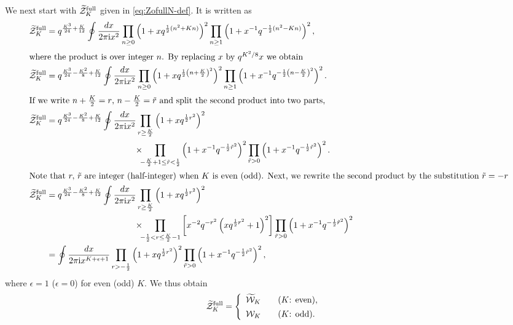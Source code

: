 \documentclass[11pt]{article}
\newcommand{\ri}{{\rm i}}
\newcommand{\hf}{\frac{1}{2}}
\def\til#1{\widetilde{#1}}
\newcommand{\nn}{\nonumber}
\renewcommand{\[}{\begin{eqnarray}}
\renewcommand{\]}{\end{eqnarray}}
\newcommand{\Zofull}{{\widetilde{\cal Z}}^{\text{full}}}
\begin{document}
We next start with $\Zofull_K$ given in \eqref{eq:ZofullN-def}.
It is written as
%
\begin{align}
\Zofull_K
&=q^{\frac{K^3}{24}+\frac{K}{12}}\oint\frac{dx}{2\pi\ri x^2}
 \prod_{n\ge 0}\left(1+xq^{\hf(n^2+Kn)}\right)^2
 \prod_{n\ge 1}\left(1+x^{-1}q^{-\hf(n^2-Kn)}\right)^2,\nn\\
\intertext{where the product is over integer $n$.
By replacing $x$ by $q^{K^2/8}x$ we obtain}
\Zofull_K
&=q^{\frac{K^3}{24}-\frac{K^2}{8}+\frac{K}{12}}\oint\frac{dx}{2\pi\ri x^2}
 \prod_{n\ge 0}\left(1+xq^{\hf\left(n+\frac{K}{2}\right)^2}\right)^2
 \prod_{n\ge 1}
  \left(1+x^{-1}q^{-\hf\left(n-\frac{K}{2}\right)^2}\right)^2.\nn\\
\intertext{If we write
$n+\frac{K}{2}=r$, $n-\frac{K}{2}=\tilde{r}$ and split the second
 product into two parts,}
\Zofull_K
&=q^{\frac{K^3}{24}-\frac{K^2}{8}+\frac{K}{12}}\oint\frac{dx}{2\pi\ri x^2}
 \prod_{r\ge\frac{K}{2}}\left(1+xq^{\hf r^2}\right)^2\nn\\
&\phantom{=q^{\frac{K^3}{24}-\frac{K^2}{8}+\frac{K}{12}}
          \oint\frac{dx}{2\pi\ri x^2}}
 \times\hspace{-.5em}
 \prod_{-\frac{K}{2}+1\le\tilde{r}<\hf}
  \left(1+x^{-1}q^{-\hf \tilde{r}^2}\right)^2
 \prod_{\tilde{r}>0}\left(1+x^{-1}q^{-\hf \tilde{r}^2}\right)^2.\nn\\
\intertext{Note that $r,\,\tilde{r}$ are integer (half-integer)
when $K$ is even (odd).
Next, we rewrite the second product by the substitution $\tilde{r}=-r$}
\Zofull_K
&=q^{\frac{K^3}{24}-\frac{K^2}{8}+\frac{K}{12}}\oint\frac{dx}{2\pi\ri x^2}
 \prod_{r\ge\frac{K}{2}}\left(1+xq^{\hf r^2}\right)^2\nn\\
&\phantom{=q^{\frac{K^3}{24}-\frac{K^2}{8}+\frac{K}{12}}
          \oint\frac{dx}{2\pi\ri x^2}}
 \times\hspace{-.5em}\prod_{-\hf<r\le\frac{K}{2}-1}
 \left[x^{-2}q^{-r^2}\left(xq^{\hf r^2}+1\right)^2\right]
 \prod_{\tilde{r}>0}\left(1+x^{-1}q^{-\hf \tilde{r}^2}\right)^2\nn\\
&=\oint\frac{dx}{2\pi\ri x^{K+\epsilon+1}}
 \prod_{r>-\hf}\left(1+xq^{\hf r^2}\right)^2
 \prod_{\tilde{r}>0}\left(1+x^{-1}q^{-\hf \tilde{r}^2}\right)^2,\nn
\end{align}
%
where $\epsilon=1$ ($\epsilon=0$) for even (odd) $K$.
We thus obtain
%
\begin{align}
\Zofull_K
&=\left\{\begin{array}{l}
\til{\mathcal{W}}_K \qquad \mbox{($K$: even)},\\[1ex]
\mathcal{W}_K \qquad \mbox{($K$: odd)}.
	 \end{array}\right.
\end{align}
%
\end{document}
